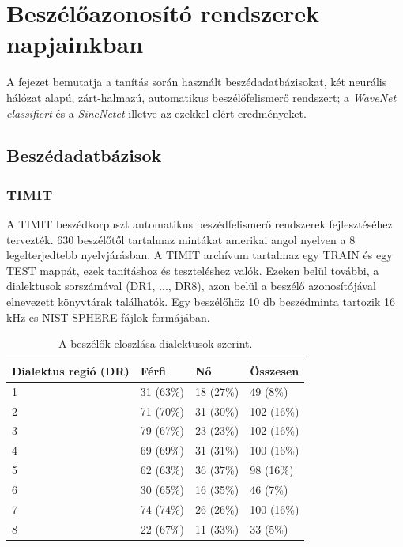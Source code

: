 \chapter{Beszélőazonosító rendszerek napjainkban}

A fejezet bemutatja a tanítás során használt beszédadatbázisokat, két neurális hálózat alapú, zárt-halmazú, automatikus beszélőfelismerő rendszert; a \emph{WaveNet classifiert} és a \emph{SincNetet} illetve az ezekkel elért eredményeket.

\section{Beszédadatbázisok}

\subsection{TIMIT}

A TIMIT beszédkorpuszt automatikus beszédfelismerő rendszerek fejlesztéséhez tervezték. 630 beszélőtől tartalmaz mintákat amerikai angol nyelven a 8 legelterjedtebb nyelvjárásban.
A TIMIT archívum tartalmaz egy TRAIN és egy TEST mappát, ezek tanításhoz és teszteléshez valók. Ezeken belül további, a dialektusok sorszámával (DR1, ..., DR8), azon belül a beszélő azonosítójával elnevezett könyvtárak találhatók. Egy beszélőhöz
10 db beszédminta tartozik 16 kHz-es NIST SPHERE fájlok formájában.


\begin{table}[!ht]
	\begin{tabular}{*4l} \toprule
		\bfseries Dialektus regió (DR) & \bfseries Férfi & \bfseries Nő & \bfseries Összesen \\ \midrule
		1                             & 31 (63\%)      & 18 (27\%)   & 49 (8\%)          \\
		\rowcolor{gray!10} 
		2                             & 71 (70\%)      & 31 (30\%)   & 102 (16\%)        \\
		3                             & 79 (67\%)      & 23 (23\%)   & 102 (16\%)        \\
		\rowcolor{gray!10} 
		4                             & 69 (69\%)      & 31 (31\%)   & 100 (16\%)        \\
		5                             & 62 (63\%)      & 36 (37\%)   & 98 (16\%)         \\
		\rowcolor{gray!10} 
		6                             & 30 (65\%)      & 16 (35\%)   & 46 (7\%)          \\
		7                             & 74 (74\%)      & 26 (26\%)   & 100 (16\%)        \\
		\rowcolor{gray!10} 
		8                             & 22 (67\%)      & 11 (33\%)   & 33 (5\%)          \\
		\bottomrule
		\hline
	\end{tabular}
	\centering
	\caption{A beszélők eloszlása dialektusok szerint.}
	\label{fig:timit-dialects}
\end{table}

